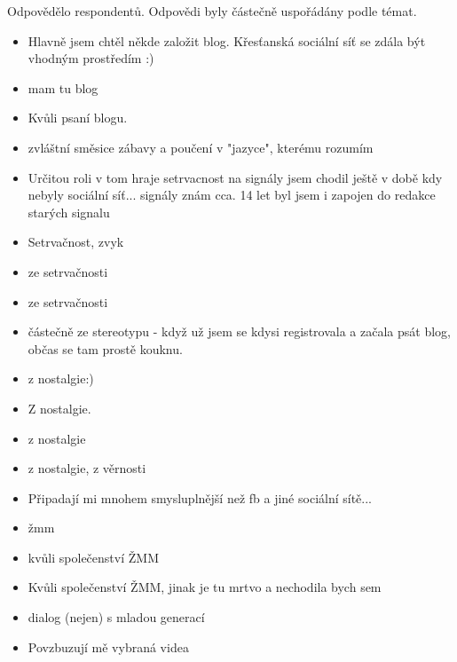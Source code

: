 \documentclass[12pt, a4paper, twoside]{article}
\newcommand{\answercount}[1]{Odpovědělo  respondentů}
\begin{document}
\answercount{proc_signaly_jine}.
Odpovědi byly částečně uspořádány podle témat.

\begin{itemize}
\item Hlavně jsem chtěl někde založit blog. Křesťanská sociální síť se zdála být vhodným prostředím :)

\item mam tu blog

\item Kvůli psaní blogu.

\item zvláštní směsice zábavy  a poučení v "jazyce", kterému rozumím

\item Určitou roli v tom hraje setrvacnost na signály jsem chodil ještě v době kdy nebyly sociální síť... signály znám cca. 14 let byl jsem i zapojen do redakce starých signalu

\item Setrvačnost, zvyk

\item ze setrvačnosti

\item ze setrvačnosti

\item částečně ze stereotypu - když už jsem se kdysi registrovala a začala psát blog, občas se tam prostě kouknu.

\item z nostalgie:)

\item Z nostalgie.

\item z nostalgie

\item z nostalgie, z věrnosti

\item Připadají mi mnohem smysluplnější než fb a jiné sociální sítě...

\item žmm

\item kvůli společenství ŽMM

\item Kvůli společenství ŽMM, jinak je tu mrtvo a nechodila bych sem

\item dialog (nejen) s mladou generací

\item Povzbuzují mě vybraná videa


\end{itemize}
\end{document}
